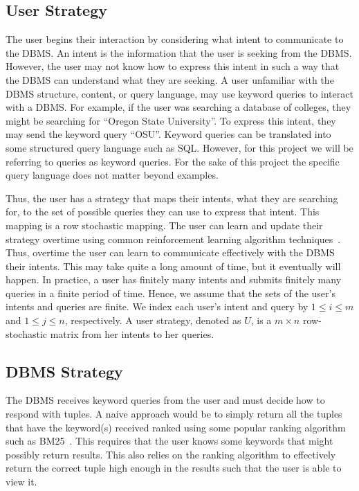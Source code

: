 \documentclass{article}
\begin{document}
\subsection{User Strategy}
The user begins their interaction by considering what intent to communicate to the DBMS. An intent is the information that the user is seeking from the DBMS. However, the user may not know how to express this intent in such a way that the DBMS can understand what they are seeking. A user unfamiliar with the DBMS structure, content, or query language, may use keyword queries to interact with a DBMS. For example, if the user was searching a database of colleges, they might be searching for ``Oregon State University''. To express this intent, they may send the keyword query ``OSU''. Keyword queries can be translated into some structured query language such as SQL. However, for this project we will be referring to queries as keyword queries. For the sake of this project the specific query language does not matter beyond examples.

Thus, the user has a strategy that maps their intents, what they are searching for, to the set of possible queries they can use to express that intent. This mapping is a row stochastic mapping. The user can learn and update their strategy overtime using common reinforcement learning algorithm techniques~\cite{roth1995learning,cross1973stochastic,bush1953stochastic,cen2013reinforcement}. Thus, overtime the user can learn to communicate effectively with the DBMS their intents. This may take quite a long amount of time, but it eventually will happen. In practice, a user has finitely many intents and submits finitely many queries in a finite period of time. Hence, we assume that the sets of the user's intents and queries are finite. We index each user's intent and query by $1 \leq i \leq m$ and $1 \leq j \leq n$, respectively. A user strategy, denoted as $U$, is a $m\times n$ row-stochastic matrix from her intents to her queries. 

\subsection{DBMS Strategy}
The DBMS receives keyword queries from the user and must decide how to respond with tuples. A naive approach would be to simply return all the tuples that have the keyword(s) received ranked using some popular ranking algorithm such as BM25~\cite{robertson2009probabilistic}. This requires that the user knows some keywords that might possibly return results. This also relies on the ranking algorithm to effectively return the correct tuple high enough in the results such that the user is able to view it. 
\end{document}
